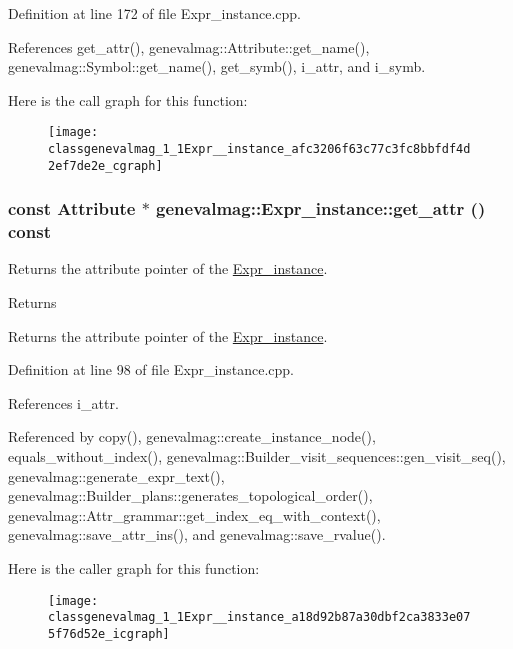 Definition at line 172 of file Expr\_\-instance.cpp.



References get\_\-attr(), genevalmag::Attribute::get\_\-name(), genevalmag::Symbol::get\_\-name(), get\_\-symb(), i\_\-attr, and i\_\-symb.



Here is the call graph for this function:\nopagebreak
\begin{figure}[H]
\begin{center}
\leavevmode
\texttt{[image: classgenevalmag\_1\_1Expr\_\_instance\_afc3206f63c77c3fc8bbfdf4d2ef7de2e\_cgraph]}
\end{center}
\end{figure}


\hypertarget{classgenevalmag_1_1Expr__instance_a18d92b87a30dbf2ca3833e075f76d52e}{
\subsubsection[{get\_\-attr}]{\setlength{\rightskip}{0pt plus 5cm}const {\bf Attribute} $\ast$ genevalmag::Expr\_\-instance::get\_\-attr () const}}
\label{classgenevalmag_1_1Expr__instance_a18d92b87a30dbf2ca3833e075f76d52e}
Returns the attribute pointer of the \hyperlink{classgenevalmag_1_1Expr__instance}{Expr\_\-instance}. \begin{DoxyReturn}{Returns}

\end{DoxyReturn}
Returns the attribute pointer of the \hyperlink{classgenevalmag_1_1Expr__instance}{Expr\_\-instance}. 

Definition at line 98 of file Expr\_\-instance.cpp.



References i\_\-attr.



Referenced by copy(), genevalmag::create\_\-instance\_\-node(), equals\_\-without\_\-index(), genevalmag::Builder\_\-visit\_\-sequences::gen\_\-visit\_\-seq(), genevalmag::generate\_\-expr\_\-text(), genevalmag::Builder\_\-plans::generates\_\-topological\_\-order(), genevalmag::Attr\_\-grammar::get\_\-index\_\-eq\_\-with\_\-context(), genevalmag::save\_\-attr\_\-ins(), and genevalmag::save\_\-rvalue().



Here is the caller graph for this function:\nopagebreak
\begin{figure}[H]
\begin{center}
\leavevmode
\texttt{[image: classgenevalmag\_1\_1Expr\_\_instance\_a18d92b87a30dbf2ca3833e075f76d52e\_icgraph]}
\end{center}
\end{figure}


